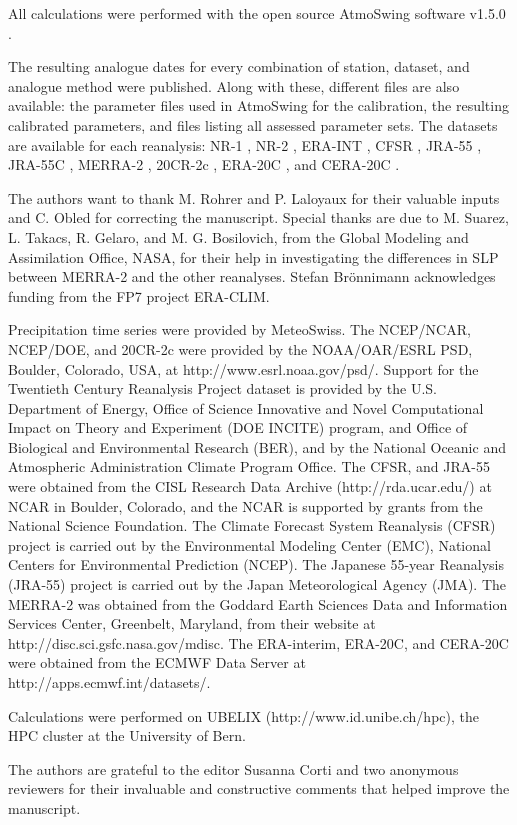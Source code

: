 \documentclass[smallextended]{svjour3}       %
\begin{document}
	All calculations were performed with the open source AtmoSwing software v1.5.0 \citep{Horton2017a}.
	
	The resulting analogue dates for every combination of station, dataset, and analogue method were published. Along with these, different files are also available: the parameter files used in AtmoSwing for the calibration, the resulting calibrated parameters, and files listing all assessed parameter sets. The datasets are available for each reanalysis: NR-1 \citep{Horton2018Da}, NR-2 \citep{Horton2018Db}, ERA-INT \citep{Horton2018Dc}, CFSR \citep{Horton2018Dd}, JRA-55 \citep{Horton2018De}, JRA-55C \citep{Horton2018Df}, MERRA-2 \citep{Horton2018Dg}, 20CR-2c \citep{Horton2018Dh}, ERA-20C \citep{Horton2018Di}, and CERA-20C \citep{Horton2018Dj}.
	
	
	
	\begin{acknowledgements}
	The authors want to thank M. Rohrer and P. Laloyaux for their valuable inputs and C. Obled for correcting the manuscript. Special thanks are due to M. Suarez, L. Takacs, R. Gelaro, and M. G. Bosilovich, from the Global Modeling and Assimilation Office, NASA, for their help in investigating the differences in SLP between MERRA-2 and the other reanalyses. Stefan Br\"{o}nnimann acknowledges funding from the FP7 project ERA-CLIM.
	
	Precipitation time series were provided by MeteoSwiss. The NCEP/NCAR, NCEP/DOE, and 20CR-2c were provided by the NOAA/OAR/ESRL PSD, Boulder, Colorado, USA, at http://www.esrl.noaa.gov/psd/. Support for the Twentieth Century Reanalysis Project dataset is provided by the U.S. Department of Energy, Office of Science Innovative and Novel Computational Impact on Theory and Experiment (DOE INCITE) program, and Office of Biological and Environmental Research (BER), and by the National Oceanic and Atmospheric Administration Climate Program Office. The CFSR, and JRA-55 were obtained from the CISL Research Data Archive (http://rda.ucar.edu/) at NCAR in Boulder, Colorado, and the NCAR is supported by grants from the National Science Foundation. The Climate Forecast System Reanalysis (CFSR) project is carried out by the Environmental Modeling Center (EMC), National Centers for Environmental Prediction (NCEP). The Japanese 55-year Reanalysis (JRA-55) project is carried out by the Japan Meteorological Agency (JMA). The MERRA-2 was obtained from the Goddard Earth Sciences Data and Information Services Center, Greenbelt, Maryland, from their website at http://disc.sci.gsfc.nasa.gov/mdisc. The ERA-interim, ERA-20C, and CERA-20C were obtained from the ECMWF Data Server at http://apps.ecmwf.int/datasets/. 
	
	Calculations were performed on UBELIX (http://www.id.unibe.ch/hpc), the HPC cluster at the University of Bern. 
	
	The authors are grateful to the editor Susanna Corti and two anonymous reviewers for their invaluable and constructive comments that helped improve the manuscript.
	\end{acknowledgements}
	
\end{document}
